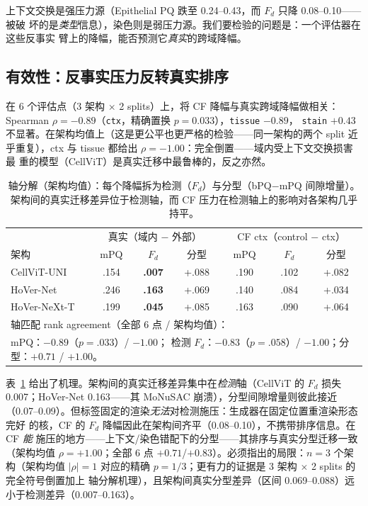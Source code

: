 \documentclass[11pt]{article}
\begin{document}
上下文交换是强压力源（Epithelial PQ 跌至 0.24--0.43，而 $F_d$ 只降 0.08--0.10——被破
坏的是\emph{类型}信息），染色则是弱压力源。我们要检验的问题是：一个评估器在这些反事实
臂上的降幅，能否预测它\emph{真实}的跨域降幅。

\subsection{有效性：反事实压力反转真实排序}
\label{sec:validity}

在 6 个评估点（3 架构 $\times$ 2 splits）上，将 CF 降幅与真实跨域降幅做相关：Spearman
$\rho=-0.89$（\texttt{ctx}，精确置换 $p=0.033$），\texttt{tissue} $-0.89$，
\texttt{stain} $+0.43$ 不显著。在架构均值上（这是更公平也更严格的检验——同一架构的两个
split 近乎重复），ctx 与 tissue 都给出 $\rho=-1.00$：完全倒置——域内受上下文交换损害最
重的模型（CellViT）是真实迁移中最鲁棒的，反之亦然。

\begin{table}[t]
\centering\small
\caption{轴分解（架构均值）：每个降幅拆为检测（$F_d$）与分型（bPQ$-$mPQ 间隙增量）。
架构间的真实迁移差异位于检测轴，而 CF 压力在检测轴上的影响对各架构几乎持平。}
\label{tab:axes}
\begin{tabular}{lcc|cc|cc}
\toprule
& \multicolumn{3}{c|}{真实（域内 $-$ 外部）} & \multicolumn{3}{c}{CF ctx（control $-$ ctx）} \\
架构 & mPQ & $F_d$ & 分型 & mPQ & $F_d$ & 分型 \\
\midrule
CellViT-UNI  & .154 & \textbf{.007} & +.088 & .190 & .102 & +.082 \\
HoVer-Net    & .246 & \textbf{.163} & +.069 & .140 & .084 & +.034 \\
HoVer-NeXt-T & .199 & \textbf{.045} & +.085 & .163 & .090 & +.064 \\
\midrule
\multicolumn{7}{l}{\footnotesize 轴匹配 rank agreement（全部 6 点 / 架构均值）：}\\
\multicolumn{7}{l}{\footnotesize\quad mPQ：$-0.89$（$p{=}.033$）/ $-1.00$；\quad
检测 $F_d$：$-0.83$（$p{=}.058$）/ $-1.00$；\quad 分型：$+0.71$ / $\mathbf{+1.00}$。}\\
\bottomrule
\end{tabular}
\end{table}

表~\ref{tab:axes} 给出了机理。架构间的真实迁移差异集中在\emph{检测}轴（CellViT 的
$F_d$ 损失 0.007；HoVer-Net 0.163——其 MoNuSAC 崩溃），分型间隙增量则彼此接近
（0.07--0.09）。但标签固定的渲染\emph{无法}对检测施压：生成器在固定位置重渲染形态完好
的核，CF 的 $F_d$ 降幅因此在架构间齐平（0.08--0.10），不携带排序信息。在 CF \emph{能}
施压的地方——上下文/染色错配下的分型——其排序与真实分型迁移一致（架构均值
$\rho=+1.00$；全部 6 点 $+0.71$/$+0.83$）。必须指出的局限：$n=3$ 个架构（架构均值
$|\rho|=1$ 对应的精确 $p=1/3$；更有力的证据是 3 架构 $\times$ 2 splits 的完全符号倒置加上
轴分解机理），且架构间真实分型差异（区间 0.069--0.088）远小于检测差异（0.007--0.163）。
\end{document}
